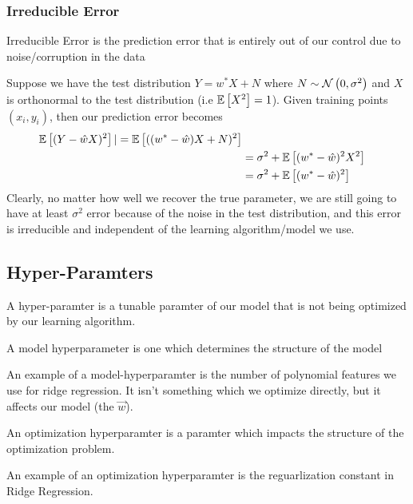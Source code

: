 \subsubsection{Irreducible Error}
\begin{definition}
  Irreducible Error is the prediction error that is entirely out of our control due to noise/corruption in the data
\end{definition}
Suppose we have the test distribution $Y = w^*X + N$ where $N\sim\mathcal{N}\left(0, \sigma^2\right)$ and $X$ is orthonormal to the test distribution (i.e $\mathbb{E}\left[X^2\right] = 1$).
Given training points $(x_i, y_i)$, then our prediction error becomes
\begin{align*}
  \mathbb{E}\left[(Y-\hat{w}X)^2\right] |= \mathbb{E}\left[((w^*-\hat{w})X+N)^2\right] \\
  &= \sigma^2 + \mathbb{E}\left[(w^*-\hat{w})^2X^2\right]\\
  &= \sigma^2 + \mathbb{E}\left[(w^*-\hat{w})^2\right]
\end{align*}
Clearly, no matter how well we recover the true parameter, we are still going to have at least $\sigma^2$ error because of the noise in the test distribution, and this error is irreducible and independent of the learning algorithm/model we use.
\subsection{Hyper-Paramters}
\begin{definition}
  A hyper-paramter is a tunable paramter of our model that is not being optimized by our learning algorithm.
  \label{defn:hyperparameter}
\end{definition}
\begin{definition}
  A model hyperparameter is one which determines the structure of the model
  \label{defn:model-hyperparameter}
\end{definition}
An example of a model-hyperparamter is the number of polynomial features we use for ridge regression. It isn't something which we optimize directly, but it affects our model (the $\vec{w}$).
\begin{definition}
  An optimization hyperparamter is a paramter which impacts the structure of the optimization problem.
  \label{defn:optim-hyperparamter}
\end{definition}
An example of an optimization hyperparamter is the reguarlization constant in Ridge Regression.
